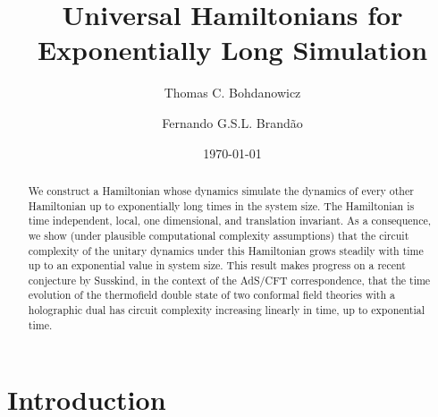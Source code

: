 \documentclass[11pt,letterpaper]{article}
\newcommand{\<}{\langle}
\renewcommand{\>}{\rangle}
\begin{document}
\title{Universal Hamiltonians for Exponentially Long Simulation}

\author{Thomas C. Bohdanowicz}

\author{Fernando G.S.L. Brand\~ao}





\date{\today}


\maketitle

\begin{abstract}
We construct a Hamiltonian whose dynamics simulate the dynamics of every other Hamiltonian up to exponentially long times in the system size. The Hamiltonian is time independent, local, one dimensional, and translation invariant. As a consequence, we show (under plausible computational complexity assumptions) that the circuit complexity of the unitary dynamics under this Hamiltonian grows steadily with time up to an exponential value in system size. This result makes progress on a recent conjecture by Susskind, in the context of the AdS/CFT correspondence, that the time evolution of the thermofield double state of two conformal field theories with a holographic dual has circuit complexity increasing linearly in time, up to exponential time.
\end{abstract}

\section{Introduction}
\end{document}
